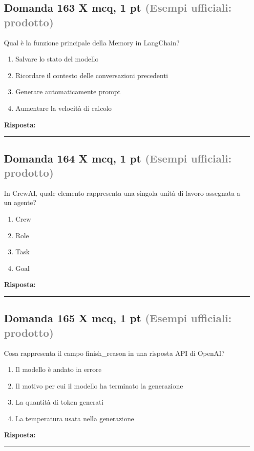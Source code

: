 \documentclass[a4paper,11pt]{article}
\begin{document}
\subsection*{Domanda 163 X \hfill {\small mcq, 1 pt \textcolor{gray}{(Esempi ufficiali: prodotto)}}}
Qual è la funzione principale della Memory in LangChain?

\begin{enumerate}[label=\alph*)]
\item Salvare lo stato del modello
\item Ricordare il contesto delle conversazioni precedenti
\item Generare automaticamente prompt
\item Aumentare la velocità di calcolo
\end{enumerate}
\vspace{0.2cm}
\noindent\textbf{Risposta:}\par
\vspace{1.5cm}\hrule


\subsection*{Domanda 164 X \hfill {\small mcq, 1 pt \textcolor{gray}{(Esempi ufficiali: prodotto)}}}
In CrewAI, quale elemento rappresenta una singola unità di lavoro assegnata a un agente?

\begin{enumerate}[label=\alph*)]
\item Crew
\item Role
\item Task
\item Goal
\end{enumerate}
\vspace{0.2cm}
\noindent\textbf{Risposta:}\par
\vspace{1.5cm}\hrule


\subsection*{Domanda 165 X \hfill {\small mcq, 1 pt \textcolor{gray}{(Esempi ufficiali: prodotto)}}}
Cosa rappresenta il campo finish\_reason in una risposta API di OpenAI?

\begin{enumerate}[label=\alph*)]
\item Il modello è andato in errore
\item Il motivo per cui il modello ha terminato la generazione
\item La quantità di token generati
\item La temperatura usata nella generazione
\end{enumerate}
\vspace{0.2cm}
\noindent\textbf{Risposta:}\par
\vspace{1.5cm}\hrule
\end{document}
